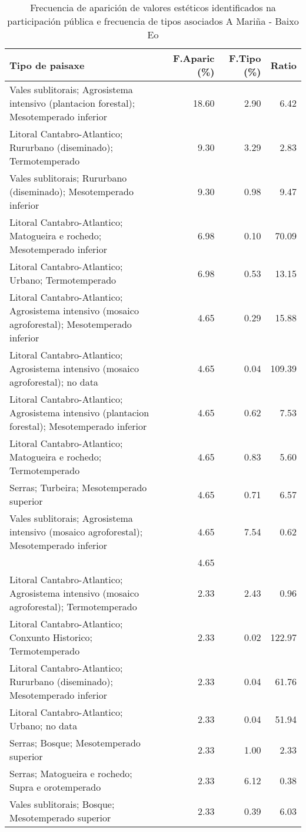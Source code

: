 \begin{table}[p]
\centering
\caption{Frecuencia de aparición de valores estéticos identificados na participación pública e frecuencia de tipos asociados A Mariña - Baixo Eo} 
\label{vsixotest2}
\begin{tabular}{lrrr}
  \hline
Tipo de paisaxe & F.Aparic (\%) & F.Tipo (\%) & Ratio \\ 
  \hline
Vales sublitorais; Agrosistema intensivo (plantacion forestal); Mesotemperado inferior & 18.60 & 2.90 & 6.42 \\ 
  Litoral Cantabro-Atlantico; Rururbano (diseminado); Termotemperado & 9.30 & 3.29 & 2.83 \\ 
  Vales sublitorais; Rururbano (diseminado); Mesotemperado inferior & 9.30 & 0.98 & 9.47 \\ 
  Litoral Cantabro-Atlantico; Matogueira e rochedo; Mesotemperado inferior & 6.98 & 0.10 & 70.09 \\ 
  Litoral Cantabro-Atlantico; Urbano; Termotemperado & 6.98 & 0.53 & 13.15 \\ 
  Litoral Cantabro-Atlantico; Agrosistema intensivo (mosaico agroforestal); Mesotemperado inferior & 4.65 & 0.29 & 15.88 \\ 
  Litoral Cantabro-Atlantico; Agrosistema intensivo (mosaico agroforestal); no data & 4.65 & 0.04 & 109.39 \\ 
  Litoral Cantabro-Atlantico; Agrosistema intensivo (plantacion forestal); Mesotemperado inferior & 4.65 & 0.62 & 7.53 \\ 
  Litoral Cantabro-Atlantico; Matogueira e rochedo; Termotemperado & 4.65 & 0.83 & 5.60 \\ 
  Serras; Turbeira; Mesotemperado superior & 4.65 & 0.71 & 6.57 \\ 
  Vales sublitorais; Agrosistema intensivo (mosaico agroforestal); Mesotemperado inferior & 4.65 & 7.54 & 0.62 \\ 
   & 4.65 &  &  \\ 
  Litoral Cantabro-Atlantico; Agrosistema intensivo (mosaico agroforestal); Termotemperado & 2.33 & 2.43 & 0.96 \\ 
  Litoral Cantabro-Atlantico; Conxunto Historico; Termotemperado & 2.33 & 0.02 & 122.97 \\ 
  Litoral Cantabro-Atlantico; Rururbano (diseminado); Mesotemperado inferior & 2.33 & 0.04 & 61.76 \\ 
  Litoral Cantabro-Atlantico; Urbano; no data & 2.33 & 0.04 & 51.94 \\ 
  Serras; Bosque; Mesotemperado superior & 2.33 & 1.00 & 2.33 \\ 
  Serras; Matogueira e rochedo; Supra e orotemperado & 2.33 & 6.12 & 0.38 \\ 
  Vales sublitorais; Bosque; Mesotemperado superior & 2.33 & 0.39 & 6.03 \\ 
   \hline
\end{tabular}
\end{table}
